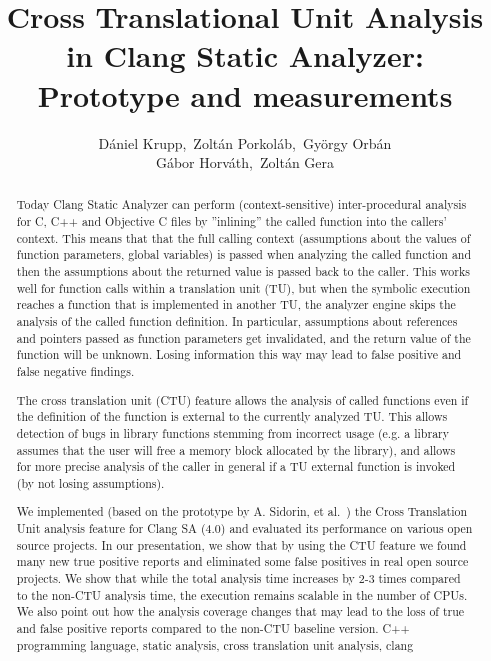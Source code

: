 \documentclass{article}
\title{Cross Translational Unit Analysis in Clang Static Analyzer: Prototype and measurements}
\author{D\'aniel Krupp\inst1,\ Zolt\'an Porkol\'ab\inst1,\ Gy\"orgy Orb\'an\inst1\\
        G\'abor Horv\'ath\inst2,\ Zolt\'an Gera\inst2}
\institute{\inst1Ericsson Ltd., \inst2E\"{o}tv\"{o}s Lor\'{a}nd University, Faculty of Informatics\\
             \inst1\url{daniel.krupp@ericsson.com}, 
             \inst1\url{zoltan.porkolab@ericsson.com},
             \inst1\url{gyorgy.orban@ericsson.com},
             \inst2\url{xazax@caesar.elte.hu}, 
             \inst2\url{gerazo@caesar.elte.hu}}
\begin{document}
\maketitle


\begin{abstract}
Today Clang Static Analyzer \cite{clangsa} can perform (context-sensitive) inter-procedural analysis for 
C, C++ and Objective C files by ''inlining'' 
the called function into the callers' context. This means that that the full 
calling context
(assumptions about the values of function parameters, global variables) is passed when 
analyzing the called function and
then the assumptions about the returned value is passed back to the caller. 
This works well for function calls within a
translation unit (TU), but when the symbolic execution reaches a function that 
is implemented in another TU, the analyzer engine 
skips the analysis of the called function definition. In particular,
assumptions about references and pointers passed as function 
parameters get invalidated, and the return value of the function will be unknown.
Losing information this way may lead to false positive
and false negative findings.

The cross translation unit (CTU) feature allows the analysis of called 
functions even if the definition of the function is external to the currently 
analyzed TU. This allows detection of bugs in library functions stemming
from incorrect usage (e.g. a library assumes that the user will free a memory 
block allocated by the library), and allows for more precise analysis
of the caller in general if a TU external function is invoked
(by not losing assumptions).

We implemented (based on the prototype by A. Sidorin, et al.~\cite{artemctu})
the Cross Translation Unit analysis feature for Clang SA (4.0) and evaluated 
its performance on various open source projects. In our presentation, we show 
that by using the CTU feature we found many new true positive reports and 
eliminated some false positives in real open source projects. We show that 
while the total analysis time increases by 2-3 times compared to 
the non-CTU analysis time, the execution remains scalable in the number of CPUs. 
We also point out how the analysis
coverage changes that may lead to the loss of true and false positive reports 
compared to the non-CTU baseline version.
\keywords C++ programming language, static analysis, cross translation unit analysis, clang
\end{abstract}
\end{document}
